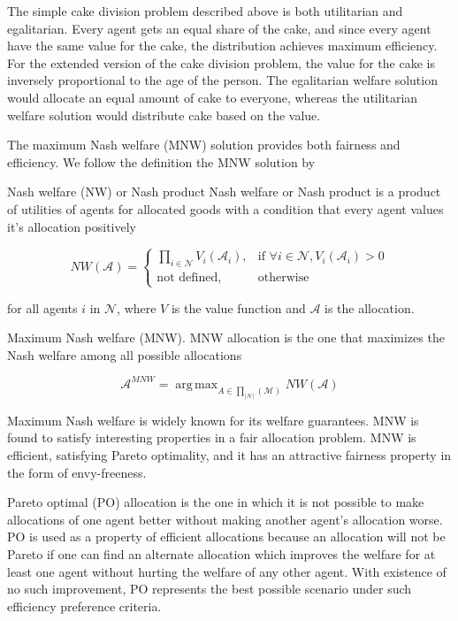 The simple cake division problem described above is both utilitarian and egalitarian. Every agent gets an equal share of the cake, and since every agent have the same value for the cake, the distribution achieves maximum efficiency. For the extended version of the cake division problem, the value for the cake is inversely proportional to the age of the person. The egalitarian welfare solution would allocate an equal amount of cake to everyone, whereas the utilitarian welfare solution would distribute cake based on the value.

The maximum Nash welfare (MNW) solution provides both fairness and efficiency. We follow the definition the MNW solution by \citet{caragiannis2016unreasonable}

\begin{definition}{Nash welfare (NW) or Nash product} \label{def_nw}
Nash welfare or Nash product is a product of utilities of agents for allocated goods with a condition that every agent values it's allocation positively

\begin{equation}
    NW(\mathcal{A}) = 
    \begin{cases}
    \prod_{i \in \mathcal{N}} V_i(\mathcal{A}_i), & \text{if } \forall i \in \mathcal{N}, V_i(\mathcal{A}_i) > 0 \\
    \text{not defined}, & \text{otherwise}
    \end{cases}
\end{equation}

for all agents $i$ in $\mathcal{N}$, where $V$ is the value function and $\mathcal{A}$ is the allocation.
\end{definition}

\begin{definition}{Maximum Nash welfare (MNW).} \label{def_mnw}
MNW allocation is the one that maximizes the Nash welfare among all possible allocations

$$
    \mathcal{A}^{MNW} = \operatorname{arg\,max}_{A \in \prod_{|\mathcal{N}|}(\mathcal{M})} NW(\mathcal{A})
$$
\end{definition}


Maximum Nash welfare is widely known for its welfare guarantees. MNW is found to satisfy interesting properties in a fair allocation problem. MNW is efficient, satisfying Pareto optimality, and it has an attractive fairness property in the form of envy-freeness.

Pareto optimal (PO) allocation is the one in which it is not possible to make allocations of one agent better without making another agent's allocation worse. PO is used as a property of efficient allocations because an allocation will not be Pareto if one can find an alternate allocation which improves the welfare for at least one agent without hurting the welfare of any other agent. With existence of no such improvement, PO represents the best possible scenario under such efficiency preference criteria.

